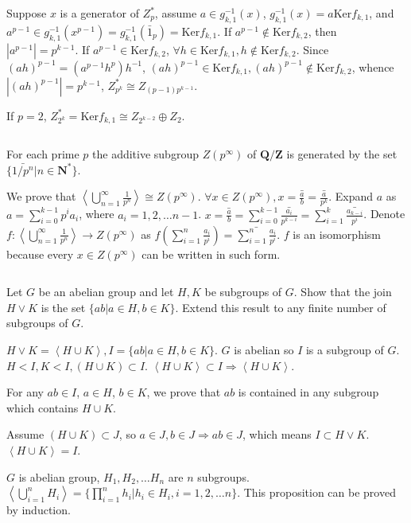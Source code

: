 \begin{answer}
    Suppose $x$ is a generator of $Z_{p}^{*}$, assume $a\in g_{k,1}^{-1}(x)$, $g_{k,1}^{-1}(x)=a\mathrm{Ker}f_{k,1}$, and $a^{p-1}\in g_{k,1}^{-1}(x^{p-1})=g_{k,1}^{-1}(\bar{1}_{p})=\mathrm{Ker}f_{k,1}$. If $a^{p-1}\notin \mathrm{Ker}f_{k,2}$, then $\left| a^{p-1} \right| =p^{k-1}$. If $a^{p-1}\in \mathrm{Ker}f_{k,2}$, $\forall h\in \mathrm{Ker}f_{k,1},h \notin\mathrm{Ker}f_{k,2}$. Since $(ah)^{p-1}=(a^{p-1}h^{p})h^{-1}$, $(ah)^{p-1}\in \mathrm{Ker}f_{k,1}, (ah)^{p-1}\notin \mathrm{Ker}f_{k,2}$, whence $\left| (ah)^{p-1} \right|=p^{k-1} $, $Z_{p^{k}}^{*}\cong Z_{(p-1)p^{k-1}}$.

    If $p=2$, $Z_{2^{k}}^{*}=\mathrm{Ker}f_{k,1}\cong Z_{2^{k-2}}\oplus Z_{2}$.
\end{answer}

$$ $$

\begin{ex}
    For each prime $p$ the additive subgroup $Z(p^\infty)$ of $\mathbf{Q}/\mathbf{Z}$ is generated by the set $\{\bar{1/p^n}|n\in \mathbf{N^*}\}$.
\end{ex}

\begin{answer}
    We prove that $\left\langle\bigcup\limits_{n=1}^{\infty}\frac{1}{p^{n}}\right\rangle\cong Z(p^{\infty})$. $\forall x\in Z(p^{\infty}), x=\bar{\frac{a}{b}}=\bar{\frac{a}{p^{k}}}$. Expand $a$ as $a=\sum\limits_{i=0}^{k-1}p^{i}a_{i}$, where $a_{i}=1,2,\dots n-1$. $x=\bar{\frac{a}{b}}=\sum\limits_{i=0}^{k-1}\bar{\frac{a_{i}}{p^{k-i}}}=\sum\limits_{i=1}^{k}\bar{\frac{a_{k-i}}{p^{i}}}$. Denote $f: \left\langle\bigcup\limits_{n=1}^{\infty}\frac{1}{p^{n}}\right\rangle\to Z(p^{\infty})$ as $f(\sum\limits_{i=1}^{n}\frac{a_{i}}{p^{i}})=\bar{\sum\limits_{i=1}^{n}\frac{a_{i}}{p^{i}}}$. $f$ is an isomorphism because every $x\in Z(p^{\infty})$ can be written in such form.
\end{answer}

$$ $$

\begin{ex}
    Let $G$ be an abelian group and let $H, K$ be subgroups of $G$. Show that the join $H\vee K$ is the set $\{ab|a\in H, b\in K\}$. Extend this result to any finite number of subgroups of $G$.
\end{ex}

\begin{answer}
    $H\vee K=\left\langle H\cup K\right\rangle, I=\{ab| a\in H,b\in K\}$. $G$ is abelian so $I$ is a subgroup of $G$. $H<I, K<I, (H\cup K)\subset I$. $\left\langle H\cup K\right\rangle\subset I\Rightarrow \left\langle H\cup K\right\rangle$.

    For any $ab\in I$, $a\in H$, $b\in K$, we prove that $ab$ is contained in any subgroup which contains $H\cup K$.

    Assume $(H\cup K)\subset J$, so $a\in J, b\in J\Rightarrow ab\in J$, which means $I\subset H\vee K$. $\left\langle H\cup K\right\rangle = I$.

    $G$ is abelian group, $H_1, H_2,\dots H_n$ are $n$ subgroups. $\left\langle\bigcup\limits_{i=1}^{n}H_i\right\rangle=\{\prod\limits_{i=1}^{n}h_{i}|h_{i}\in H_{i},i=1,2,\dots n\}$. This proposition can be proved by induction.
\end{answer}

